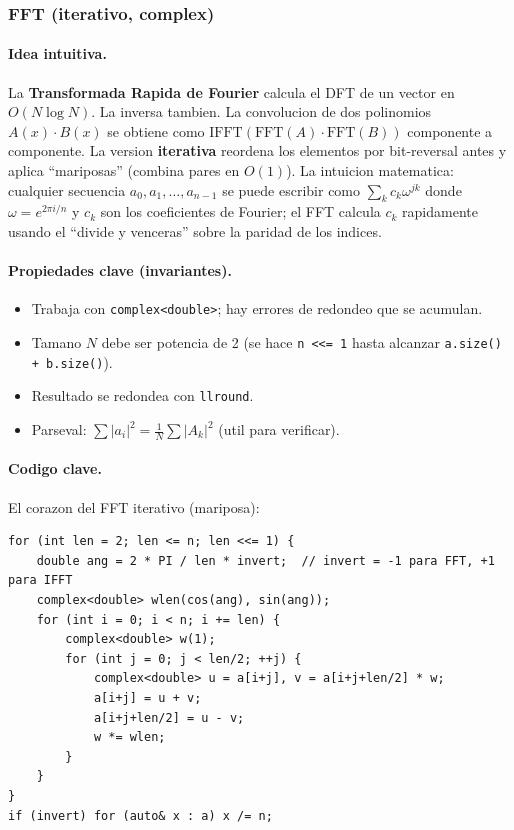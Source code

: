 ﻿\subsubsection{FFT (iterativo, complex)}

\paragraph{Idea intuitiva.}
La \textbf{Transformada Rapida de Fourier} calcula el DFT de un vector en $O(N \log N)$. La inversa tambien. La convolucion de dos polinomios $A(x) \cdot B(x)$ se obtiene como $\text{IFFT}(\text{FFT}(A) \cdot \text{FFT}(B))$ componente a componente. La version \textbf{iterativa} reordena los elementos por bit-reversal antes y aplica ``mariposas'' (combina pares en $O(1)$). La intuicion matematica: cualquier secuencia $a_0, a_1, \dots, a_{n-1}$ se puede escribir como $\sum_k c_k \omega^{jk}$ donde $\omega = e^{2\pi i / n}$ y $c_k$ son los coeficientes de Fourier; el FFT calcula $c_k$ rapidamente usando el ``divide y venceras'' sobre la paridad de los indices.

\paragraph{Propiedades clave (invariantes).}
\begin{itemize}\setlength\itemsep{0pt}
	\item Trabaja con \texttt{complex<double>}; hay errores de redondeo que se acumulan.
	\item Tamano $N$ debe ser potencia de 2 (se hace \texttt{n <<= 1} hasta alcanzar \texttt{a.size() + b.size()}).
	\item Resultado se redondea con \texttt{llround}.
	\item Parseval: $\sum |a_i|^2 = \frac{1}{N} \sum |A_k|^2$ (util para verificar).
\end{itemize}

\paragraph{Codigo clave.}
El corazon del FFT iterativo (mariposa):
\begin{verbatim}
for (int len = 2; len <= n; len <<= 1) {
    double ang = 2 * PI / len * invert;  // invert = -1 para FFT, +1 para IFFT
    complex<double> wlen(cos(ang), sin(ang));
    for (int i = 0; i < n; i += len) {
        complex<double> w(1);
        for (int j = 0; j < len/2; ++j) {
            complex<double> u = a[i+j], v = a[i+j+len/2] * w;
            a[i+j] = u + v;
            a[i+j+len/2] = u - v;
            w *= wlen;
        }
    }
}
if (invert) for (auto& x : a) x /= n;
\end{verbatim}

